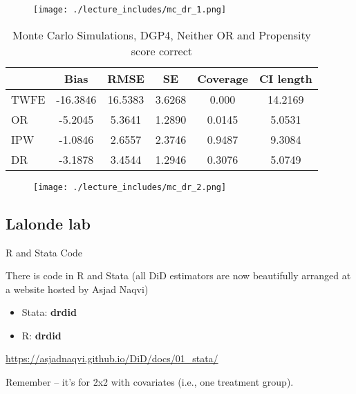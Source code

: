 \documentclass{beamer}
\begin{document}
\begin{frame}[plain]
	\begin{figure}
	\texttt{[image: ./lecture\_includes/mc\_dr\_1.png]}
	\end{figure}

\end{frame}


\begin{frame}[plain]

\begin{table}[htbp]\centering
\scriptsize
\caption{Monte Carlo Simulations, DGP4, Neither OR and Propensity score correct}
\centering
\begin{threeparttable}
\begin{tabular}{l*{5}{c}}
\toprule
\multicolumn{1}{l}{\textbf{}}&
\multicolumn{1}{c}{\textbf{Bias}}&
\multicolumn{1}{c}{\textbf{RMSE}}&
\multicolumn{1}{c}{\textbf{SE}}&
\multicolumn{1}{c}{\textbf{Coverage}}&
\multicolumn{1}{c}{\textbf{CI length}}\\
\midrule
TWFE & -16.3846 & 16.5383 & 3.6268 & 0.000 & 14.2169 \\
OR & -5.2045 & 5.3641 & 1.2890 & 0.0145 & 5.0531 \\
IPW & -1.0846 & 2.6557 & 2.3746 & 0.9487 & 9.3084 \\
DR & -3.1878 & 3.4544 & 1.2946 & 0.3076 & 5.0749 \\
\bottomrule
\end{tabular}
\end{threeparttable}
\end{table}

\end{frame}

\begin{frame}[plain]
	\begin{figure}
	\texttt{[image: ./lecture\_includes/mc\_dr\_2.png]}
	\end{figure}


\end{frame}

\subsection{Lalonde lab}

\begin{frame}{R and Stata Code}

There is code in R and Stata (all DiD estimators are now beautifully arranged at a website hosted by Asjad Naqvi)
\begin{itemize}
\item Stata: \textbf{drdid}
\item R: \textbf{drdid}
\end{itemize}

\bigskip

\url{https://asjadnaqvi.github.io/DiD/docs/01_stata/}

\bigskip

Remember -- it's for 2x2 with covariates (i.e., one treatment group). 

\end{frame}
\end{document}
